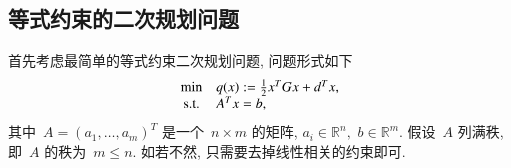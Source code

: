 \subsection{等式约束的二次规划问题}
\label{subsec:7.2.1}

首先考虑最简单的等式约束二次规划问题, 问题形式如下
\begin{equation}
\label{eq:quadratic-programming-eq-constrained}
\begin{array}{cl}
\min & q({x}) := \frac{1}{2} {x}^T G {x} + {d}^T {x}, \\
{\rm s.t.} & A^T {x} = {b},
\end{array}
\end{equation}
其中~$A = ({a}_1, \ldots, {a}_m)^T$ 是一个~$n \times m$ 的矩阵, ${a}_i \in \mathbb{R}^n,$ ${b} \in \mathbb{R}^m.$ 假设~$A$ 列满秩, 即~$A$ 的秩为~$m \leqslant n.$ 如若不然, 只需要去掉线性相关的约束即可.


